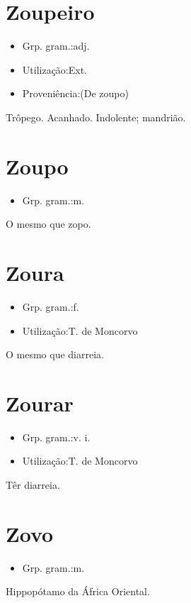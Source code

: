 \section{Zoupeiro}
\begin{itemize}
\item {Grp. gram.:adj.}
\end{itemize}
\begin{itemize}
\item {Utilização:Ext.}
\end{itemize}
\begin{itemize}
\item {Proveniência:(De \textunderscore zoupo\textunderscore )}
\end{itemize}
Trôpego.
Acanhado.
Indolente; mandrião.
\section{Zoupo}
\begin{itemize}
\item {Grp. gram.:m.}
\end{itemize}
O mesmo que \textunderscore zopo\textunderscore .
\section{Zoura}
\begin{itemize}
\item {Grp. gram.:f.}
\end{itemize}
\begin{itemize}
\item {Utilização:T. de Moncorvo}
\end{itemize}
O mesmo que \textunderscore diarreia\textunderscore .
\section{Zourar}
\begin{itemize}
\item {Grp. gram.:v. i.}
\end{itemize}
\begin{itemize}
\item {Utilização:T. de Moncorvo}
\end{itemize}
Têr diarreia.
\section{Zovo}
\begin{itemize}
\item {Grp. gram.:m.}
\end{itemize}
Hippopótamo da África Oriental.
